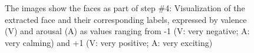 \begin{figure}[H]
  \hfill
  \caption[ER pipeline step \#4: Face extraction]{The images show the faces as part of step \#4: Visualization of the extracted face and their corresponding labels, expressed by valence (V) and arousal (A) as values ranging from -1 (V: very negative; A: very calming) and +1 (V: very positive; A: very exciting)}
  \label{fig:MethodologyExtraction}
\end{figure}

